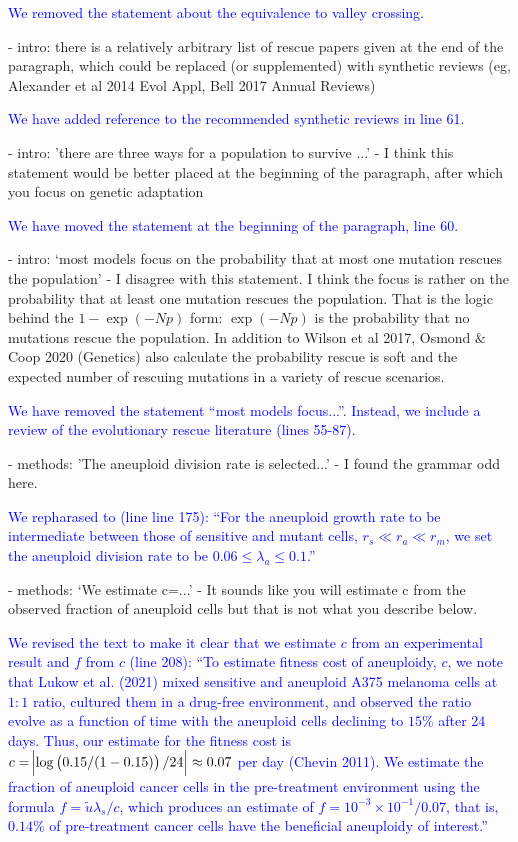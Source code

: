 \documentclass[12pt]{extarticle}
\renewcommand{\Delta}{r}
\begin{document}
\textcolor{blue}{
We removed the statement about the equivalence to valley crossing.
} 

- intro: there is a relatively arbitrary list of rescue papers given at the end of the paragraph, which could be replaced (or supplemented) with synthetic reviews (eg, Alexander et al 2014 Evol Appl, Bell 2017 Annual Reviews)

\textcolor{blue}{%
We have added reference to the recommended synthetic reviews in line 61.
} 

- intro: 'there are three ways for a population to survive ...' - I think this statement would be better placed at the beginning of the paragraph, after which you focus on genetic adaptation

\textcolor{blue}{%
We have  moved the statement at the beginning of the paragraph, line 60. 
} 

- intro: `most models focus on the probability that at most one mutation rescues the population' - I disagree with this statement. I think the focus is rather on the probability that at least one mutation rescues the population. That is the logic behind the $1-\exp(-Np)$ form: $\exp(-Np)$ is the probability that no mutations rescue the population. In addition to Wilson et al 2017, Osmond $\&$ Coop 2020 (Genetics) also calculate the probability rescue is soft and the expected number of rescuing mutations in a variety of rescue scenarios.

\textcolor{blue}{%
We have removed the statement ``most models focus...''. Instead, we include a review of the evolutionary rescue literature (lines 55-87).
} 

- methods: 'The aneuploid division rate is selected...' - I found the grammar odd here.

\textcolor{blue}{%
We repharased to (line line 175): ``For the aneuploid growth rate to be intermediate between those of sensitive and mutant cells, $\Delta_s\ll\Delta_a\ll\Delta_m$, we set the aneuploid division rate to be $0.06 \le \lambda_a \le 0.1$.''
} 

- methods: `We estimate c=...' - It sounds like you will estimate c from the observed fraction of aneuploid cells but that is not what you describe below.

\textcolor{blue}{%
We revised the text to make it clear that we estimate $c$ from an experimental result and $f$ from $c$ (line 208): ``To estimate fitness cost of aneuploidy, $c$, we note that Lukow et al. (2021) mixed sensitive and aneuploid A375 melanoma cells at $1:1$ ratio, cultured them in a drug-free environment, and observed the ratio evolve as a function of time with the aneuploid cells declining to $15\%$ after 24 days. Thus, our estimate for the fitness cost is $c=\abs{\log\left(0.15/(1-0.15)\right)/24}\approx0.07$ per day (Chevin 2011).
We estimate the fraction of aneuploid cancer cells in the pre-treatment environment using the formula $f=\tilde{u}\lambda_s / c$, which produces an estimate of $f=10^{-3}\times10^{-1}/0.07$, that is, $0.14\%$ of pre-treatment cancer cells have the beneficial aneuploidy of interest.''
} 
\end{document}
